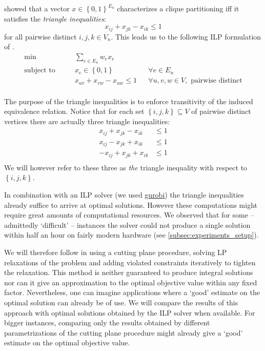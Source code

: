\cite{grotschelFacetsCliquePartitioning1990} showed that a vector $x \in \left\{ 0,1 \right\}^{E_{n}}$ characterizes a clique partitioning iff it satisfies the \textit{triangle inequalities}:
\begin{equation}\label{eq:triangle_inequality}
	 x_{ij} + x_{jk} - x_{ik} \leq 1
\end{equation}
for all pairwise distinct $i,j,k \in V_{n}$.
This leads us to the following ILP formulation of \CP.
\begin{align*}
	\min && &\sum_{e \in E_{n}} w_{e} x_{e} \\[1.5ex]
	\text{subject to } && &x_{e} \in \left\{ 0,1 \right\} && \forall e \in E_{n} \\
					   && &x_{uv} + x_{vw} - x_{uw} \leq 1 && \forall u,v,w \in V, \text{ pairwise distinct} \\
\end{align*}

The purpose of the triangle inequalities is to enforce transitivity of the induced equivalence relation.
Notice that for each set $\left\{ i,j,k \right\} \subseteq V$ of pairwise distinct vertices there are actually three triangle inequalities:
\begin{align*}
	x_{ij} + x_{jk} - x_{ik} &\leq 1\\
	x_{ij} - x_{jk} + x_{ik} &\leq 1\\
	- x_{ij} + x_{jk} + x_{ik} &\leq 1\\
\end{align*}
We will however refer to these three as \textit{the} triangle inequality with respect to $\left\{ i,j,k \right\}$.

In combination with an ILP solver (we used \href{www.gurobi.com}{gurobi}) the triangle inequalities already suffice to arrive at optimal solutions.
However these computations might require great amounts of computational resources.
We observed that for some – admittedly ‘difficult’ – instances the solver could not produce a single solution within half an hour on fairly modern hardware (see \cref{subsec:experiments_setup}).

We will therefore follow \cite{grotschelFacetsCliquePartitioning1990} in using a cutting plane procedure, \ie solving LP relaxations of the problem and adding violated constraints iteratively to tighten the relaxation.
This method is neither guaranteed to produce integral solutions nor can it give an approximation to the optimal objective value within any fixed factor.
Nevertheless, one can imagine applications where a ‘good’ estimate on the optimal solution can already be of use.
We will compare the results of this approach with optimal solutions obtained by the ILP solver when available.
For bigger instances, comparing only the results obtained by different parametrizations of the cutting plane procedure might already give a ‘good’ estimate on the optimal objective value.
